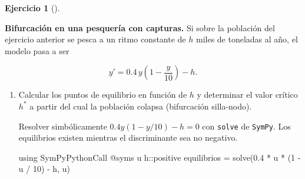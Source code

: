 \documentclass[
  spanish,
  a4paper,
]{scrreport}
\newenvironment{Shaded}{\begin{snugshade}}{\end{snugshade}}
\newcommand{\BuiltInTok}[1]{\textcolor[rgb]{0.00,0.23,0.31}{#1}}
\newcommand{\DataTypeTok}[1]{\textcolor[rgb]{0.68,0.00,0.00}{#1}}
\newcommand{\FloatTok}[1]{\textcolor[rgb]{0.68,0.00,0.00}{#1}}
\newcommand{\FunctionTok}[1]{\textcolor[rgb]{0.28,0.35,0.67}{#1}}
\newcommand{\ImportTok}[1]{\textcolor[rgb]{0.00,0.46,0.62}{#1}}
\newcommand{\NormalTok}[1]{\textcolor[rgb]{0.00,0.23,0.31}{#1}}
\newcommand{\OperatorTok}[1]{\textcolor[rgb]{0.37,0.37,0.37}{#1}}
\newcommand{\PreprocessorTok}[1]{\textcolor[rgb]{0.68,0.00,0.00}{#1}}
\theoremstyle{definition}
\newtheorem{exercise}{Ejercicio}[chapter]
\theoremstyle{remark}
\begin{document}
\begin{exercise}[]\protect\hypertarget{exr-bifurcacion-pesca}{}\label{exr-bifurcacion-pesca}

\textbf{Bifurcación en una pesquería con capturas.} Si sobre la
población del ejercicio anterior se pesca a un ritmo constante de \(h\)
miles de toneladas al año, el modelo pasa a ser

\[
y' = 0.4\,y\left(1-\frac{y}{10}\right) - h.
\]

\begin{enumerate}
\def\labelenumi{\alph{enumi}.}
\item
  Calcular los puntos de equilibrio en función de \(h\) y determinar el
  valor crítico \(h^*\) a partir del cual la población colapsa
  (bifurcación silla-nodo).

  \begin{tcolorbox}[enhanced jigsaw, arc=.35mm, bottomrule=.15mm, bottomtitle=1mm, breakable, colback=white, colbacktitle=quarto-callout-note-color!10!white, colframe=quarto-callout-note-color-frame, coltitle=black, left=2mm, leftrule=.75mm, opacityback=0, opacitybacktitle=0.6, rightrule=.15mm, title=\textcolor{quarto-callout-note-color}{\faInfo}\hspace{0.5em}{Ayuda}, titlerule=0mm, toprule=.15mm, toptitle=1mm]

  Resolver simbólicamente \(0.4y(1-y/10)-h=0\) con \texttt{solve} de
  \texttt{SymPy}. Los equilibrios existen mientras el discriminante sea
  no negativo.

  \end{tcolorbox}

  \begin{tcolorbox}[enhanced jigsaw, arc=.35mm, bottomrule=.15mm, bottomtitle=1mm, breakable, colback=white, colbacktitle=quarto-callout-tip-color!10!white, colframe=quarto-callout-tip-color-frame, coltitle=black, left=2mm, leftrule=.75mm, opacityback=0, opacitybacktitle=0.6, rightrule=.15mm, title=\textcolor{quarto-callout-tip-color}{\faLightbulb}\hspace{0.5em}{Solución}, titlerule=0mm, toprule=.15mm, toptitle=1mm]

\begin{Shaded}
\begin{Highlighting}[]
\ImportTok{using} \BuiltInTok{SymPyPythonCall}
\PreprocessorTok{@syms}\NormalTok{ u h}\OperatorTok{::}\DataTypeTok{positive}
\NormalTok{equilibrios }\OperatorTok{=} \FunctionTok{solve}\NormalTok{(}\FloatTok{0.4} \OperatorTok{*}\NormalTok{ u }\OperatorTok{*}\NormalTok{ (}\FloatTok{1} \OperatorTok{{-}}\NormalTok{ u }\OperatorTok{/} \FloatTok{10}\NormalTok{) }\OperatorTok{{-}}\NormalTok{ h, u)}
\end{Highlighting}
\end{Shaded}


\end{tcolorbox}
\end{enumerate}
\end{exercise}
\end{document}
